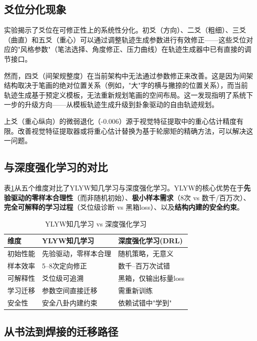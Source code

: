 \subsection{爻位分化现象}

实验揭示了爻位在可修正性上的系统性分化。初爻（方向）、二爻（粗细）、三爻（曲直）和五爻（重心）可以通过调整轨迹生成参数进行有效修正——这些爻位对应的"风格参数"（笔法选择、角度修正、压力曲线）在轨迹生成器中已有直接的调节接口。

然而，四爻（间架规整度）在当前架构中无法通过参数修正来改善。这是因为间架结构取决于笔画的绝对位置关系（例如，"大"字的横与撇捺的位置关系），而当前轨迹生成基于预定义模板，无法重新规划笔画的空间布局。这一发现指明了系统下一步的升级方向——从模板轨迹生成升级到卦象驱动的自由轨迹规划。

上爻（重心纵向）的微弱退化（-0.006）源于视觉特征提取中的重心估计精度有限。改善视觉特征提取器或将重心估计替换为基于轮廓矩的精确方法，可以解决这一问题。

\subsection{与深度强化学习的对比}

表\ref{tab:comparison}从五个维度对比了YLYW知几学习与深度强化学习。YLYW的核心优势在于\textbf{先验驱动的零样本合理性}（而非随机初始）、\textbf{极小样本需求}（8次 vs 数千/百万次）、\textbf{完全可解释的学习过程}（爻位级诊断 vs 黑箱loss）、以及\textbf{结构内建的安全约束}。

\begin{table}[htbp]
\centering
\caption{YLYW知几学习 vs 深度强化学习}
\label{tab:comparison}
\begin{tabular}{p{2.5cm}p{4.5cm}p{4.5cm}}
\toprule
维度 & YLYW知几学习 & 深度强化学习(DRL) \\
\midrule
初始性能 & 先验驱动，零样本合理 & 随机策略，无意义 \\
样本效率 & 5--8次定向修正 & 数千--百万次试错 \\
可解释性 & 爻位级可追溯 & 黑箱，仅输出标量loss \\
学习迁移 & 参数空间直接迁移 & 需重新训练 \\
安全性 & 安全八卦内建约束 & 依赖试错中"学到" \\
\bottomrule
\end{tabular}
\end{table}

\subsection{从书法到焊接的迁移路径}

